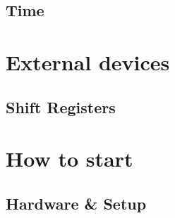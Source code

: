 \documentclass[twoside,12pt,authoryear,openright]{book}
\begin{document}
\chapter{Time}




\part{External devices}

\chapter{Shift Registers}




\part{How to start}

\chapter{Hardware & Setup}


\end{document}
